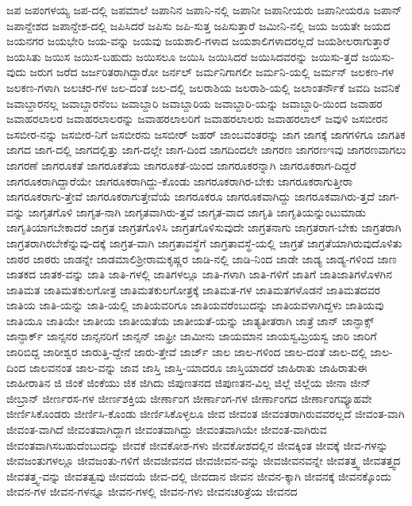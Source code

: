 {ಜಪ
ಜಪಂಗಳಯ್ಯ
ಜಪ-ದಲ್ಲಿ
ಜಪಮಾಲೆ
ಜಪಾನಿನ
ಜಪಾನಿ-ನಲ್ಲಿ
ಜಪಾನೀ
ಜಪಾನೀಯರು
ಜಪಾನೀಯರೂ
ಜಪಾನ್
ಜಪಾನ್ದೇಶದ
ಜಪಾನ್ದೇಶ-ದಲ್ಲಿ
ಜಪಿಸಿದರೆ
ಜಪಿಸು
ಜಪಿ-ಸುತ್ತ
ಜಪಿಸುತ್ತಾರೆ
ಜಮೀನಿ-ನಲ್ಲಿ
ಜಯ
ಜಯತೇ
ಜಯದ
ಜಯನಗರ
ಜಯಭೇರಿ
ಜಯ-ವನ್ನು
ಜಯವು
ಜಯಶಾಲಿ-ಗಳಾದ
ಜಯಶಾಲಿಗಳಾದರಲ್ಲದೆ
ಜಯಶೀಲರಾಗುತ್ತಾರೆ
ಜಯಸಿತು
ಜಯಿಸ
ಜಯಿಸ-ಬಹುದು
ಜಯಿಸಲೂ
ಜಯಿಸಿ
ಜಯಿಸಿದರೆ
ಜಯಿಸಿದವರನ್ನು
ಜಯಿಸು-ತ್ತದೆ
ಜಯಿಸು-ವುದು
ಜರುಗ
ಜರೆದ
ಜರ್ಜರಿತರಾಗಿದ್ದಾರೋ
ಜರ್ನಲ್
ಜರ್ಮನಿಗಾಗಲೀ
ಜರ್ಮನಿ-ಯಲ್ಲಿ
ಜರ್ಮನ್
ಜಲಕಣ-ಗಳ
ಜಲಕಣ-ಗಳಾಗಿ
ಜಲಚರ-ಗಳ
ಜಲ-ದಂತೆ
ಜಲ-ದಲ್ಲಿ
ಜಲರಾಶಿಯ
ಜಲರಾಶಿ-ಯಲ್ಲಿ
ಜಲಾಂತರ್ನೌಕೆ
ಜವದಿ
ಜವನಿಕೆ
ಜವಾಬ್ದಾರನಲ್ಲ
ಜವಾಬ್ದಾರನೆಂಬ
ಜವಾಬ್ದಾರಿ
ಜವಾಬ್ದಾರಿಯ
ಜವಾಬ್ದಾರಿ-ಯನ್ನು
ಜವಾಬ್ದಾರಿ-ಯಿಂದ
ಜವಾಹರ
ಜವಾಹರಲಾಲರ
ಜವಾಹರಲಾಲರನ್ನು
ಜವಾಹರಲಾಲರಿಗೆ
ಜವಾಹರಲಾಲರು
ಜವಾಹರಲಾಲ್
ಜವುಳಿ
ಜಸಬೀರನ
ಜಸಬೀರ-ನನ್ನು
ಜಸಬೀರ-ನಿಗೆ
ಜಸಬೀರನು
ಜಸಬೀರ್
ಜಹರ್
ಜಾಂಬವಂತರನ್ನು
ಜಾಗ
ಜಾಗಕ್ಕೆ
ಜಾಗಗಳಿಗೂ
ಜಾಗತಿಕ
ಜಾಗದ
ಜಾಗ-ದಲ್ಲಿ
ಜಾಗದಲ್ಲಿತ್ತು
ಜಾಗ-ದಲ್ಲೇ
ಜಾಗ-ದಿಂದ
ಜಾಗದಿಂದಲೇ
ಜಾಗರಣ
ಜಾಗರಣಇವು
ಜಾಗರಣವಾಗಲು
ಜಾಗರಣೆ
ಜಾಗರೂಕತೆ
ಜಾಗರೂಕತೆಯ
ಜಾಗರೂಕತೆ-ಯಿಂದ
ಜಾಗರೂಕರನ್ನಾಗಿ
ಜಾಗರೂಕರಾಗ-ದಿದ್ದರೆ
ಜಾಗರೂಕರಾಗಿದ್ದಾರೆಯೇ
ಜಾಗರೂಕರಾಗಿದ್ದು-ಕೊಂಡು
ಜಾಗರೂಕರಾಗಿರ-ಬೇಕು
ಜಾಗರೂಕರಾಗುತ್ತೀರಾ
ಜಾಗರೂಕರಾಗು-ತ್ತೇವೆ
ಜಾಗರೂಕರಾಗುತ್ತೇವೆಯೆ
ಜಾಗರೂಕರೂ
ಜಾಗರೂಕವಾಗಿದ್ದು
ಜಾಗರೂಕವಾಗಿರು-ತ್ತದೆ
ಜಾಗ-ವನ್ನು
ಜಾಗೃತಗೊಳಿ
ಜಾಗೃತ-ನಾಗಿ
ಜಾಗೃತವಾಗಿರು-ತ್ತವೆ
ಜಾಗೃತ-ವಾದ
ಜಾಗೃತಿ
ಜಾಗೃತಿಯನ್ನುಂಟುಮಾಡು
ಜಾಗೃತಿಯಾಗಬೇಕಾದರೆ
ಜಾಗ್ರತ
ಜಾಗ್ರತಗೊಳಿಸಿ
ಜಾಗ್ರತಗೊಳಿಸುವುದೇ
ಜಾಗ್ರತನಾಗು
ಜಾಗ್ರತರಾಗ-ಬೇಕು
ಜಾಗ್ರತರಾಗಿ
ಜಾಗ್ರತರಾಗಿರಬೇಕೆನ್ನುವು-ದಕ್ಕೆ
ಜಾಗ್ರತ-ವಾಗಿ
ಜಾಗ್ರತಾವಸ್ಥೆಗೆ
ಜಾಗ್ರತಾವಸ್ಥೆ-ಯಲ್ಲಿ
ಜಾಗ್ರತೆ
ಜಾಗ್ರತೆಯಾಗಿರುವುದೊಳಿತು
ಜಾಠರ
ಜಾಠರು
ಜಾಡನ್ನೇ
ಜಾಡಮಾಲಿಶ್ರೀರಾಮಕೃಷ್ಣರ
ಜಾಡಿ-ನಲ್ಲಿ
ಜಾಡಿ-ನಿಂದ
ಜಾಡೇ
ಜಾಡ್ಯ
ಜಾಡ್ಯ-ಗಳಿಂದ
ಜಾಣ
ಜಾತಕದ
ಜಾತಕ-ವನ್ನು
ಜಾತಿ
ಜಾತಿ-ಗಳಲ್ಲಿ
ಜಾತಿಗಳಲ್ಲೂ
ಜಾತಿ-ಗಳಾಗಿ
ಜಾತಿ-ಗಳಿಗೆ
ಜಾತಿಗೆ
ಜಾತಿಜಾತಿಗಳೊಳಗಿನ
ಜಾತಿಮತ
ಜಾತಿಮತಕುಲಗೋತ್ರ
ಜಾತಿಮತಕುಲಗೋತ್ರಕ್ಕೆ
ಜಾತಿಮತ-ಗಳ
ಜಾತಿಮತಗಳೊಡನೆ
ಜಾತಿಮತದವರ
ಜಾತಿಯ
ಜಾತಿ-ಯನ್ನು
ಜಾತಿ-ಯಲ್ಲಿ
ಜಾತಿಯವರಿಗೂ
ಜಾತಿಯವರೆಂಬುದನ್ನು
ಜಾತಿಯವಳಾಗಿದ್ದಳು
ಜಾತಿಯವು
ಜಾತಿಯೂ
ಜಾತಿಯೇ
ಜಾತೀಯ
ಜಾತೀಯತೆಯ
ಜಾತೀಯತೆ-ಯನ್ನು
ಜಾತ್ಯತೀತರಾಗಿ
ಜಾತ್ರೆ
ಜಾನ್
ಜಾನ್ಫಾಕ್ಸ್
ಜಾನ್ಫಾರ್ಕ್
ಜಾನ್ಸನರ
ಜಾನ್ಸನರಿಗೆ
ಜಾನ್ಸನ್
ಜಾಫ್ರೀ
ಜಾಮೀನು
ಜಾಯಮಾನ
ಜಾಯಸ್ವಮ್ರಿಯಸ್ವ
ಜಾರಿ
ಜಾರಿಗೆ
ಜಾರಿಬಿದ್ದ
ಜಾರೀಶ್ವರ
ಜಾರುತ್ತಿ-ದ್ದೇನೆ
ಜಾರು-ತ್ತೇವೆ
ಜಾರ್ಜ್
ಜಾಲ
ಜಾಲ-ಗಳಿಂದ
ಜಾಲ-ದಂತೆ
ಜಾಲ-ದಲ್ಲಿ
ಜಾಲ-ದಿಂದ
ಜಾಲವನಂತ
ಜಾಲ-ವನ್ನು
ಜಾವ
ಜಾಸ್ತಿ
ಜಾಸ್ತಿ-ಯಾದರೂ
ಜಾಸ್ತಿಯಾದರೆ
ಜಾಹಿರಾತು
ಜಾಹಿರಾತುಈ
ಜಾಹೀರಾತಿನ
ಜಿ
ಜಿಂಕೆ
ಜಿಂಕೆಯು
ಜಿಕ
ಜಿಗಿದು
ಜಿಪುಣತನದ
ಜಿಪುಣತನ-ವಿಲ್ಲ
ಜಿಲ್ಲೆ
ಜಿಲ್ಲೆಯ
ಜೀನಾ
ಜೀನ್
ಜೀಬ್ರಾನ್
ಜೀರ್ಣರಸ-ಗಳ
ಜೀರ್ಣಶಕ್ತಿಯ
ಜೀರ್ಣಾಂಗ
ಜೀರ್ಣಾಂಗ-ಗಳ
ಜೀರ್ಣಾಂಗದ
ಜೀರ್ಣಾಂಗವ್ಯೂಹವೇ
ಜೀರ್ಣಿಸಿಕೊಂಡರು
ಜೀರ್ಣಿಸಿ-ಕೊಂಡು
ಜೀರ್ಣಿಸಿಕೊಳ್ಳಲೂ
ಜೀವ
ಜೀವಂತ
ಜೀವಂತರಾಗಿರುವವರಲ್ಲದೆ
ಜೀವಂತ-ವಾಗಿ
ಜೀವಂತ-ವಾಗಿದೆ
ಜೀವಂತವಾಗಿದ್ದಾಗ
ಜೀವಂತವಾಗಿದ್ದು
ಜೀವಂತವಾಗಿಯೇ
ಜೀವಂತ-ವಾಗಿರುವ
ಜೀವಂತವಾಗಿಸಬಹುದೆಂಬುದನ್ನು
ಜೀವಕೆ
ಜೀವಕೋಶ-ಗಳು
ಜೀವಕೋಶದಲ್ಲಿನ
ಜೀವಕ್ಕಿಂತ
ಜೀವಕ್ಕೆ
ಜೀವ-ಗಳನ್ನು
ಜೀವಜಂತುಗಳಲ್ಲೂ
ಜೀವಜಂತು-ಗಳಿಗೆ
ಜೀವಜೀವನದ
ಜೀವಜೀವನ-ವನ್ನು
ಜೀವಜೀವನವನ್ನೇ
ಜೀವತತ್ತ್ವ
ಜೀವತತ್ತ್ವದ
ಜೀವತತ್ತ್ವ-ವನ್ನು
ಜೀವತತ್ವವು
ಜೀವದಯೆ
ಜೀವ-ದಲ್ಲಿ
ಜೀವದಾನ
ಜೀವನ
ಜೀವನ-ಕ್ಕಾಗಿ
ಜೀವನಕ್ಕೆ
ಜೀವನಕ್ಕೊಂದು
ಜೀವನ-ಗಳ
ಜೀವನ-ಗಳನ್ನೂ
ಜೀವನ-ಗಳಲ್ಲಿ
ಜೀವನ-ಗಳು
ಜೀವನಚರಿತ್ರೆಯ
ಜೀವನದ
}
